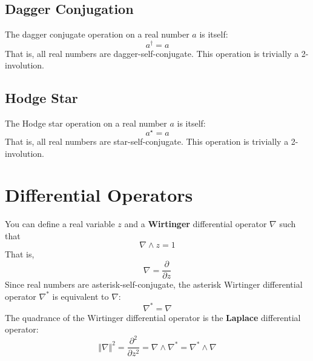 \subsection{Dagger Conjugation}
The dagger conjugate operation on a real number $a$ is itself:
\begin{equation}
    a^{\dagger} = a
\end{equation}
That is, all real numbers are dagger-self-conjugate. This operation is trivially a 2-involution.
\subsection{Hodge Star}
The Hodge star operation on a real number $a$ is itself:
\begin{equation}
    a^{\star} = a
\end{equation}
That is, all real numbers are star-self-conjugate. This operation is trivially a 2-involution.
\section{Differential Operators}
You can define a real variable $z$ and a \textbf{Wirtinger} differential operator $\nabla$ such that
\begin{equation}
    \nabla \wedge z = 1
\end{equation}
That is,
\begin{equation}
    \nabla = \frac{\partial}{\partial z}
\end{equation}
Since real numbers are asterisk-self-conjugate, the asterisk Wirtinger differential operator $\nabla^{\ast}$ is equivalent to $\nabla$:
\begin{equation}
    \nabla^{\ast} = \nabla
\end{equation}
The quadrance of the Wirtinger differential operator is the \textbf{Laplace} differential operator:
\begin{equation}
    \Vert \nabla \Vert^{2} = \frac{\partial^{2}}{\partial z^{2}} = \nabla \wedge \nabla^{\ast} = \nabla^{\ast} \wedge \nabla
\end{equation}